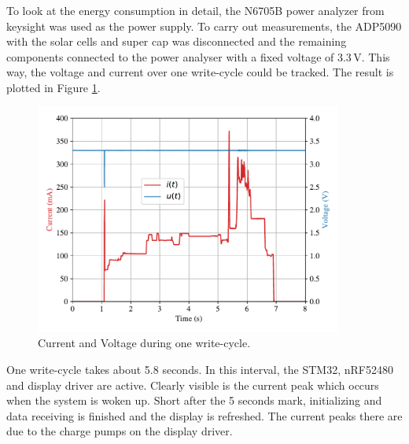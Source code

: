 To look at the energy consumption in detail, the N6705B power analyzer from keysight was used as the power supply.
To carry out measurements, the ADP5090 with the solar cells and super cap was disconnected and the remaining components connected to the power analyser with a fixed voltage of 3.3\,V.
This way, the voltage and current over one write-cycle could be tracked.
The result is plotted in Figure \ref{results:ui}.
\begin{figure}[ht]
	\centering
	\includegraphics[width=0.9\textwidth]{5-results/energy/logger/ui.pdf}
	\caption{Current and Voltage during one write-cycle.\label{results:ui}}
\end{figure}
One write-cycle takes about 5.8 seconds.
In this interval, the STM32, nRF52480 and display driver are active.
Clearly visible is the current peak which occurs when the system is woken up.
Short after the 5 seconds mark, initializing and data receiving is finished and the display is refreshed.
The current peaks there are due to the charge pumps on the display driver.

